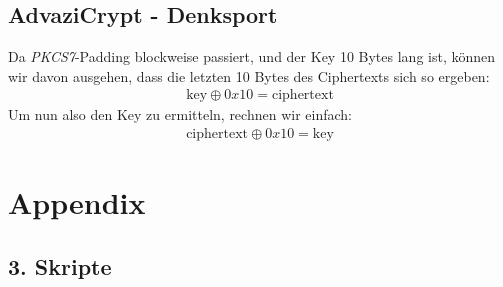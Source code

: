 \documentclass[10pt,a4paper]{article}
\begin{document}
\subsection{AdvaziCrypt - Denksport}
Da \textit{PKCS7}-Padding blockweise passiert, und der Key 10 Bytes lang ist, können
wir davon ausgehen, dass die letzten 10 Bytes des Ciphertexts sich so ergeben:
\begin{align*}
    \text{key} \oplus 0x10 = \text{ciphertext}
\end{align*}
Um nun also den Key zu ermitteln, rechnen wir einfach:
\begin{align*}
    \text{ciphertext} \oplus 0x10 = \text{key}
\end{align*}

\newpage
\section*{Appendix}
\subsection{3. Skripte}
\inputminted{python}{crack_bazi.py}
\end{document}
